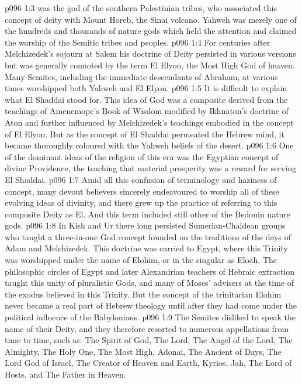 \vs p096 1:3 \bibnobreakspace {} was the god of the southern Palestinian tribes, who associated this concept of deity with Mount Horeb, the Sinai volcano. Yahweh was merely one of the hundreds and thousands of nature gods which held the attention and claimed the worship of the Semitic tribes and peoples.
\vs p096 1:4 \bibnobreakspace {} For centuries after Melchizedek’s sojourn at Salem his doctrine of Deity persisted in various versions but was generally connoted by the term El Elyon, the Most High God of heaven. Many Semites, including the immediate descendants of Abraham, at various times worshipped both Yahweh and El Elyon.
\vs p096 1:5 \bibnobreakspace {} It is difficult to explain what El Shaddai stood for. This idea of God was a composite derived from the teachings of Amenemope’s Book of Wisdom modified by Ikhnaton’s doctrine of Aton and further influenced by Melchizedek’s teachings embodied in the concept of El Elyon. But as the concept of El Shaddai permeated the Hebrew mind, it became thoroughly coloured with the Yahweh beliefs of the desert.
\vs p096 1:6 One of the dominant ideas of the religion of this era was the Egyptian concept of divine Providence, the teaching that material prosperity was a reward for serving El Shaddai.
\vs p096 1:7 \bibnobreakspace {} Amid all this confusion of terminology and haziness of concept, many devout believers sincerely endeavoured to worship all of these evolving ideas of divinity, and there grew up the practice of referring to this composite Deity as El. And this term included still other of the Bedouin nature gods.
\vs p096 1:8 \bibnobreakspace {} In Kish and Ur there long persisted Sumerian\hyp{}Chaldean groups who taught a three\hyp{}in\hyp{}one God concept founded on the traditions of the days of Adam and Melchizedek. This doctrine was carried to Egypt, where this Trinity was worshipped under the name of Elohim, or in the singular as Eloah. The philosophic circles of Egypt and later Alexandrian teachers of Hebraic extraction taught this unity of pluralistic Gods, and many of Moses’ advisers at the time of the exodus believed in this Trinity. But the concept of the trinitarian Elohim never became a real part of Hebrew theology until after they had come under the political influence of the Babylonians.
\vs p096 1:9 \bibnobreakspace {} The Semites disliked to speak the name of their Deity, and they therefore resorted to numerous appellations from time to time, such as: The Spirit of God, The Lord, The Angel of the Lord, The Almighty, The Holy One, The Most High, Adonai, The Ancient of Days, The Lord God of Israel, The Creator of Heaven and Earth, Kyrios, Jah, The Lord of Hosts, and The Father in Heaven.
